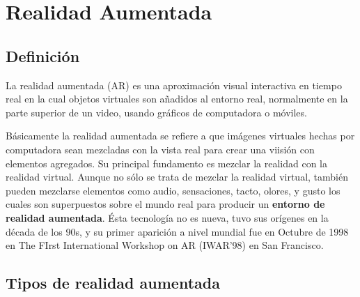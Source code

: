 \section{Realidad Aumentada}
\setcounter{secnumdepth}{2}

\subsection{Definición}
La realidad aumentada (AR) es una aproximación visual interactiva en tiempo real en la cual objetos virtuales son añadidos al entorno real, normalmente en la parte superior de un video, usando gráficos de computadora o móviles.\cite{B04} \par
Básicamente la realidad aumentada se refiere a que imágenes virtuales hechas por computadora sean mezcladas con la vista real para crear una viisión con elementos agregados. Su principal fundamento es mezclar la realidad con la realidad virtual. Aunque no sólo se trata de mezclar la realidad virtual, también pueden mezclarse elementos como audio, sensaciones, tacto, olores, y gusto los cuales son superpuestos sobre el mundo real para producir un \textbf{entorno de realidad aumentada}.\cite{B05}
Ésta tecnología no es nueva, tuvo sus orígenes en la década de los 90s\cite{B04}, y su primer aparición a nivel mundial fue en Octubre de 1998 en The FIrst International Workshop on AR (IWAR'98) en San Francisco\cite{B05}.\par

\subsection{Tipos de realidad aumentada}

